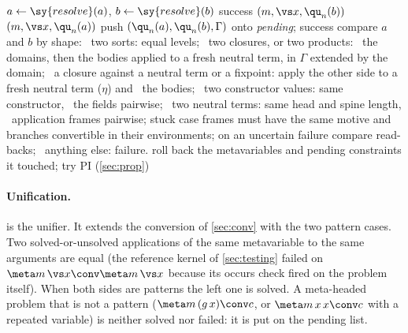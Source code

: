 \begin{algorithm}[t]
\caption{\Unify$(a,b)$ in a context $\Gamma$ of size $n$, on values; the pending list and the metavariable context are state}
\label{alg:unify}
\begin{algorithmic}[1]
\State $a \gets \sy{resolve}(a)$, $b \gets \sy{resolve}(b)$ 
 \Return success 
\EndIf
{} \Return \Solve$(m,\vs x,\qu_n(b))$ 
\EndIf
{} \Return \Solve$(m,\vs x,\qu_n(a))$
\EndIf
{} \State push $(\qu_n(a),\qu_n(b),\Gamma)$ onto \textit{pending}; \Return success 
\EndIf
\State compare $a$ and $b$ by shape:
\Statex \hspace{1.5em}\textbullet\ two sorts: equal levels;
\Statex \hspace{1.5em}\textbullet\ two closures, or two products: \Unify\ the domains, then the bodies applied to a fresh neutral term, in $\Gamma$ extended by the domain;
\Statex \hspace{1.5em}\textbullet\ a closure against a neutral term or a fixpoint: apply the other side to a fresh neutral term ($\eta$) and \Unify\ the bodies;
\Statex \hspace{1.5em}\textbullet\ two constructor values: same constructor, \Unify\ the fields pairwise;
\Statex \hspace{1.5em}\textbullet\ two neutral terms: same head and spine length, \Unify\ application frames pairwise; stuck case frames must have the same motive and branches convertible in their environments; on an uncertain failure compare read-backs;
\Statex \hspace{1.5em}\textbullet\ anything else: failure.
 \State roll back the metavariables and pending constraints it touched; try \textsc{PI} (\cref{sec:prop}) \EndIf
\end{algorithmic}
\end{algorithm}

\paragraph{Unification.}
 is the unifier.
It extends the conversion of \cref{sec:conv} with the two pattern cases.
Two solved-or-unsolved applications of the same metavariable to the same arguments are equal (the reference kernel of \cref{sec:testing} failed on $\meta m\,\vs x\conv\meta m\,\vs x$ because its occurs check fired on the problem itself).
When both sides are patterns the left one is solved.
A meta-headed problem that is not a pattern ($\meta m\,(g\,x)\conv c$, or $\meta m\,x\,x\conv c$ with a repeated variable) is neither solved nor failed: it is put on the pending list.

